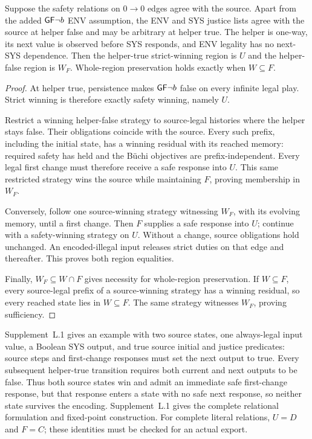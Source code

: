 \begin{proposition}\label{hpb:retained}
Suppose the safety relations on $0\to0$ edges agree with the source.
Apart from the added $\mathsf{G}\mathsf{F}\neg b$ ENV assumption, the ENV and SYS justice
lists agree with the source at helper false and may be arbitrary at
helper true. The helper is one-way, its next value is observed before
SYS responds, and ENV legality has no next-SYS dependence.
Then the helper-true strict-winning region is $U$ and the helper-false
region is $W_F$. Whole-region preservation holds exactly when $W\subseteq F$.
\end{proposition}
\begin{proof}
At helper true, persistence makes $\mathsf{G}\mathsf{F}\neg b$ false on every infinite
legal play. Strict winning is therefore exactly safety winning, namely $U$.

Restrict a winning helper-false strategy to source-legal histories where
the helper stays false. Their obligations coincide with the source.
Every such prefix, including the initial state, has a winning residual
with its reached memory: required safety has held and the B\"uchi
objectives are prefix-independent. Every legal first change must
therefore receive a safe response into $U$. This same restricted strategy
wins the source while maintaining $F$, proving membership in $W_F$.

Conversely, follow one source-winning strategy witnessing $W_F$, with
its evolving memory, until a first change. Then $F$ supplies a safe response
into $U$; continue with a safety-winning strategy on $U$. Without a change,
source obligations hold unchanged. An encoded-illegal input releases
strict duties on that edge and thereafter. This proves both region equalities.

Finally, $W_F\subseteq W\cap F$ gives necessity for whole-region
preservation. If $W\subseteq F$, every source-legal prefix of a source-winning
strategy has a winning residual, so every reached state lies in
$W\subseteq F$. The same strategy witnesses $W_F$, proving sufficiency.
\end{proof}

Supplement~L.1 gives an example with two source states, one always-legal input
value, a Boolean SYS output, and true source initial and justice predicates:
source steps and first-change responses must set the next output to true.
Every subsequent helper-true transition requires both current and next
outputs to be false. Thus both source states win and admit an immediate
safe first-change response, but that response enters a state with no safe
next response, so neither state survives the encoding.
Supplement~L.1 gives the complete relational formulation and fixed-point
construction. For complete literal relations, $U=D$ and $F=C$; these
identities must be checked for an actual export.
